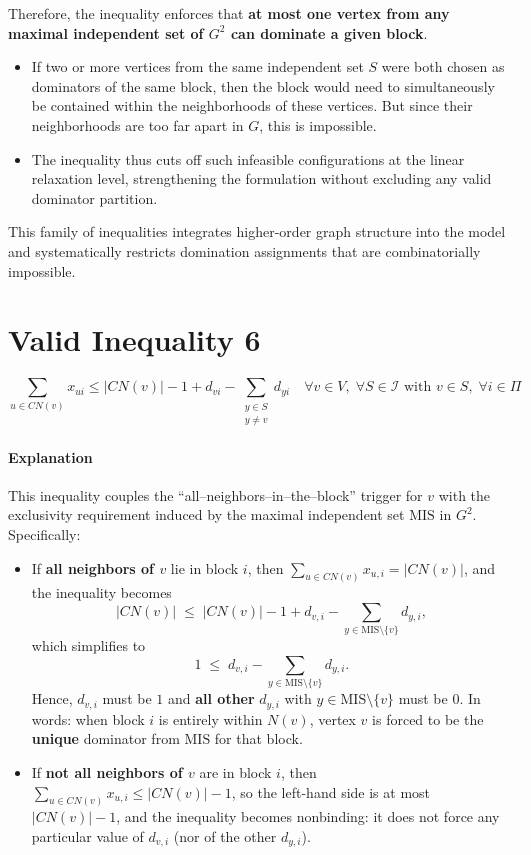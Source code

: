 Therefore, the inequality enforces that \textbf{at most one vertex from any maximal independent set of $G^2$ can dominate a given block}.  
 
\begin{itemize}
    \item If two or more vertices from the same independent set $S$ were both chosen as dominators of the same block, then the block would need to simultaneously be contained within the neighborhoods of these vertices. But since their neighborhoods are too far apart in $G$, this is impossible.
    \item The inequality thus cuts off such infeasible configurations at the linear relaxation level, strengthening the formulation without excluding any valid dominator partition.
\end{itemize}
 
This family of inequalities integrates higher-order graph structure into the model and systematically restricts domination assignments that are combinatorially impossible.

\section{Valid Inequality 6}
\begin{equation}
    \sum_{u \in CN(v)} x_{ui} \leq |CN(v)| - 1 + d_{vi} - \sum_{\substack{y \in S \\ y \neq v}} d_{yi} \quad \forall v \in V,\; \forall S \in \mathcal{I} \text{ with } v \in S,\; \forall i \in \Pi
\end{equation}
\paragraph{Explanation} This inequality couples the ``all--neighbors--in--the--block'' trigger for $v$ with the exclusivity requirement induced by the maximal independent set $\mathrm{MIS}$ in $G^2$. Specifically:
 
\begin{itemize}
    \item If \textbf{all neighbors of $v$} lie in block $i$, then $\sum_{u \in CN(v)} x_{u,i} = |CN(v)|$, and the inequality becomes
    \[
    |CN(v)| \;\le\; |CN(v)| - 1 + d_{v,i} - \sum_{y \in \mathrm{MIS}\setminus\{v\}} d_{y,i},
    \]
    which simplifies to
    \[
    1 \;\le\; d_{v,i} - \sum_{y \in \mathrm{MIS}\setminus\{v\}} d_{y,i}.
    \]
    Hence, $d_{v,i}$ must be $1$ and \textbf{all other} $d_{y,i}$ with $y \in \mathrm{MIS}\setminus\{v\}$ must be $0$. In words: when block $i$ is entirely within $N(v)$, vertex $v$ is forced to be the \textbf{unique} dominator from $\mathrm{MIS}$ for that block.
 
    \item If \textbf{not all neighbors of $v$} are in block $i$, then $\sum_{u \in CN(v)} x_{u,i} \le |CN(v)|-1$, so the left-hand side is at most $|CN(v)|-1$, and the inequality becomes nonbinding: it does not force any particular value of $d_{v,i}$ (nor of the other $d_{y,i}$).
\end{itemize}
 
